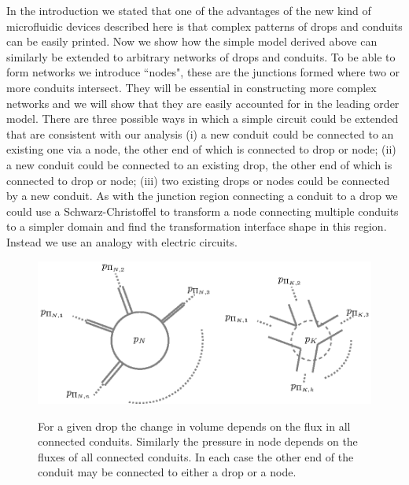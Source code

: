 \documentclass{jfm}
\newcommand{\note}[1]{{\color{Ncolour} \fontsize{14}{16.8}\selectfont \textbf{#1}}}
\begin{document}
 In the introduction we  stated that one of the advantages of the new kind of microfluidic devices described here is that complex patterns of drops and conduits can be easily printed.
Now we show how the simple model derived above can similarly  be extended to arbitrary networks of drops and conduits.
To   be able to form networks we introduce ``nodes", these are the junctions formed where two or more conduits intersect. 
 They will be essential in constructing more complex networks and we will show that they are easily accounted for in the leading order model.
 There are three possible ways in which a simple  circuit could be extended that are consistent with our analysis (i) a new  conduit  could be connected to an  existing one via a node, the other end of which is connected to  drop or node; (ii)  a new  conduit  could be connected to an  existing drop, the other end of which is connected to  drop or node; (iii) two existing drops or nodes could be connected by a new conduit.
  As with the junction region connecting a  conduit  to a drop we could use a Schwarz-Christoffel to transform a node connecting multiple conduits   to a simpler domain and find the transformation interface shape in this region.
Instead we use  an  analogy  with electric circuits.
\begin{figure} 
\centering
 {\includegraphics[width=0.8\linewidth]{Figures/Network_Nodes_V2.eps}}  
  \caption{  
  For a given drop the change in volume depends on the flux in all connected conduits.
  Similarly the pressure in node depends on the fluxes of all connected conduits.
  In each case the other end of the  conduit may be connected  to either a drop or a node. 
    } \label{fig: Network problem}
\end{figure}
\end{document}
